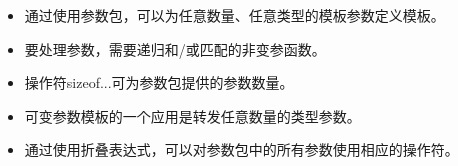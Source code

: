 
\begin{itemize}
\item 
通过使用参数包，可以为任意数量、任意类型的模板参数定义模板。

\item 
要处理参数，需要递归和/或匹配的非变参函数。

\item 
操作符sizeof...可为参数包提供的参数数量。

\item 
可变参数模板的一个应用是转发任意数量的类型参数。

\item 
通过使用折叠表达式，可以对参数包中的所有参数使用相应的操作符。
\end{itemize}
